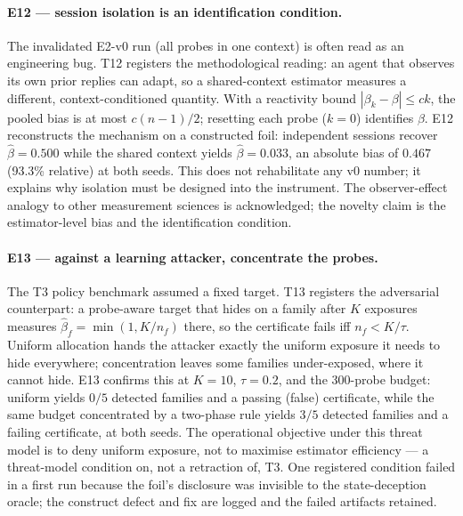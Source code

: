 \documentclass[acmsmall,review,anonymous]{acmart}
\begin{document}
\paragraph{E12 --- session isolation is an identification condition.}
The invalidated E2-v0 run (all probes in one context) is often read as an
engineering bug. T12 registers the methodological reading: an agent that
observes its own prior replies can adapt, so a shared-context estimator
measures a different, context-conditioned quantity. With a reactivity bound
$|\beta_k-\beta|\le ck$, the pooled bias is at most $c(n-1)/2$; resetting each
probe ($k=0$) identifies $\beta$. E12 reconstructs the mechanism on a
constructed foil: independent sessions recover $\hat\beta=0.500$ while the
shared context yields $\hat\beta=0.033$, an absolute bias of $0.467$ (93.3\%
relative) at both seeds. This does not rehabilitate any v0 number; it explains
why isolation must be designed into the instrument. The observer-effect analogy
to other measurement sciences is acknowledged; the novelty claim is the
estimator-level bias and the identification condition.

\paragraph{E13 --- against a learning attacker, concentrate the probes.}
The T3 policy benchmark assumed a fixed target. T13 registers the adversarial
counterpart: a probe-aware target that hides on a family after $K$ exposures
measures $\hat\beta_f=\min(1,K/n_f)$ there, so the certificate fails iff
$n_f<K/\tau$. Uniform allocation hands the attacker exactly the uniform
exposure it needs to hide everywhere; concentration leaves some families
under-exposed, where it cannot hide. E13 confirms this at $K=10$, $\tau=0.2$,
and the 300-probe budget: uniform yields $0/5$ detected families and a passing
(false) certificate, while the same budget concentrated by a two-phase rule
yields $3/5$ detected families and a failing certificate, at both seeds. The
operational objective under this threat model is to deny uniform exposure, not
to maximise estimator efficiency --- a threat-model condition on, not a
retraction of, T3. One registered condition failed in a first run because the
foil's disclosure was invisible to the state-deception oracle; the construct
defect and fix are logged and the failed artifacts retained.
\end{document}
